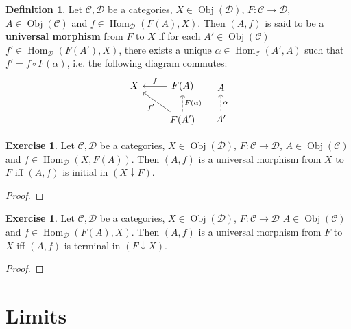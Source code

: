 \documentclass{book}
\theoremstyle{definition}
\newtheorem{defn}[definition]{Definition}
\newtheorem{ex}[definition]{Exercise}
\newcommand{\al}{\alpha}
\newcommand{\MC}{\mathcal{C}}
\newcommand{\MD}{\mathcal{D}}
\DeclareMathOperator{\Obj}{Obj}
\DeclareMathOperator{\Hom}{Hom}
\DeclareMathOperator*{\0}{\mbf{0}}
\DeclareMathOperator*{\1}{\mbf{1}}
\begin{document}
	\begin{defn}
		Let $\MC, \MD$ be a categories, $X \in \Obj(\MD)$, $F: \MC \rightarrow \MD$, $A \in \Obj(\MC)$ and $f \in \Hom_{\MD}(F(A), X)$. Then $(A, f)$ is said to be a \textbf{universal morphism} from $F$ to $X$ if for each $A' \in \Obj(\MC)$ $f' \in \Hom_{\MD}(F(A'), X)$, there exists a unique $\al \in \Hom_{\MC}(A', A)$ such that $f' = f \circ F(\al)$, i.e. the following diagram commutes:
		\[
		\begin{tikzcd}
			X   & F(A) \arrow[l, "f"'] \\
			& F(A')  \arrow[ul, "f'"] \arrow[u, "F(\al)"', dashed]  
		\end{tikzcd}
		\hspace{.3cm}
		\begin{tikzcd}
			A \\
			A'  \arrow[u, "\al"', dashed]   
		\end{tikzcd}
		\]
	\end{defn}

	\begin{ex}
		Let $\MC, \MD$ be a categories, $X \in \Obj(\MD)$, $F: \MC \rightarrow \MD$, $A \in \Obj(\MC)$ and $f \in \Hom_{\MD}(X, F(A))$. Then $(A, f)$ is a universal morphism from $X$ to $F$ iff $(A, f)$ is initial in $(X \downarrow F)$.  
	\end{ex}

	\begin{proof}
		
	\end{proof}

	\begin{ex}
		Let $\MC, \MD$ be a categories, $X \in \Obj(\MD)$, $F: \MC \rightarrow \MD$ $A \in \Obj(\MC)$ and $f \in \Hom_{\MD}(F(A), X)$. Then $(A, f)$ is a universal morphism from $F$ to $X$ iff $(A, f)$ is terminal in $(F \downarrow X)$.  
	\end{ex}

	\begin{proof}
		
	\end{proof}


















	
	
	\newpage
	\section{Limits}
	
\end{document}
